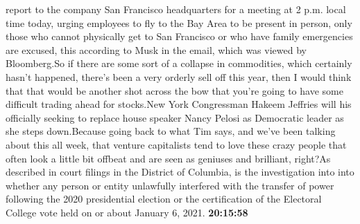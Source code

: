 \documentclass{article}%
\begin{document}
report to the company San Francisco headquarters for a meeting at 2 p.m. local time today, urging employees to fly to the Bay Area to be present in person, only those who cannot physically get to San Francisco or who have family emergencies are excused, this according to Musk in the email, which was viewed by Bloomberg.So if there are some sort of a collapse in commodities, which certainly hasn't happened, there's been a very orderly sell off this year, then I would think that that would be another shot across the bow that you're going to have some difficult trading ahead for stocks.New York Congressman Hakeem Jeffries will his officially seeking to replace house speaker Nancy Pelosi as Democratic leader as she steps down.Because going back to what Tim says, and we've been talking about this all week, that venture capitalists tend to love these crazy people that often look a little bit offbeat and are seen as geniuses and brilliant, right?As described in court filings in the District of Columbia, is the investigation into into whether any person or entity unlawfully interfered with the transfer of power following the 2020 presidential election or the certification of the Electoral College vote held on or about January 6, 2021.%
\textbf{20:15:58}%
\newline%
\end{document}
